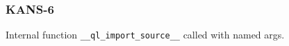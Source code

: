 \subsubsection{KANS-6}\label{sec:error_code_kans_6}

Internal function \texttt{\_\_ql\_import\_source\_\_} called with named args.


